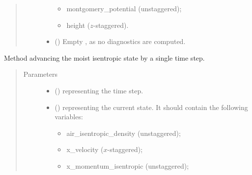 \documentclass[letterpaper,10pt,english]{sphinxmanual}
\begin{document}
\begin{fulllineitems}
\begin{fulllineitems}
\begin{quote}
\begin{description}
\begin{itemize}
\begin{itemize}
\item {} 
montgomery\_potential (unstaggered);

\item {} 
height (\(z\)-staggered).

\end{itemize}

\item {} 
 () \textendash{} Empty , as no diagnostics are computed.

\end{itemize}


\end{description}\end{quote}

\end{fulllineitems}


\begin{fulllineitems}
\label{\detokenize{api:dycore.dycore_isentropic.DynamicalCoreIsentropic._step_moist}}
Method advancing the moist isentropic state by a single time step.
\begin{quote}\begin{description}
\item[{Parameters}] \leavevmode\begin{itemize}
\item {} 
 () \textendash{}  representing the time step.

\item {} 
 () \textendash{} 
{\hyperref[\detokenize{api:storages.state_isentropic.StateIsentropic}]{}} representing the current state.
It should contain the following variables:
\begin{itemize}
\item {} 
air\_isentropic\_density (unstaggered);

\item {} 
x\_velocity (\(x\)-staggered);

\item {} 
x\_momentum\_isentropic (unstaggered);


\end{itemize}
\end{itemize}
\end{description}
\end{quote}
\end{fulllineitems}
\end{fulllineitems}
\end{document}
